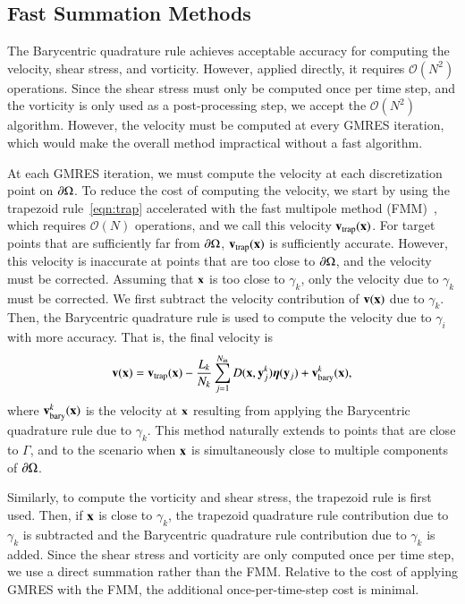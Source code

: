 \documentclass[preprint, 10pt]{elsarticle}
\begin{document}
\subsection{Fast Summation Methods}
\label{sec:fmm}
The Barycentric quadrature rule achieves acceptable accuracy for
computing the velocity, shear stress, and vorticity.  However, applied
directly, it requires $\mathcal{O}(N^2)$ operations.  Since the shear
stress must only be computed once per time step, and the vorticity is
only used as a post-processing step, we accept the $\mathcal{O}(N^2)$
algorithm.  However, the velocity must be computed at every GMRES
iteration, which would make the overall method impractical without a
fast algorithm.

At each GMRES iteration, we must compute the velocity at each
discretization point on ${\partial}\Omega$.  To reduce the cost of computing
the velocity, we start by using the trapezoid rule~\eqref{eqn:trap}
accelerated with the fast multipole method (FMM)~\cite{gre-rok1987},
which requires $\mathcal{O}(N)$ operations, and we call this velocity
${\mathbf{v}}_{\mathrm{trap}}({\mathbf{x}})$.  For target points that are sufficiently far from
${\partial}\Omega$, ${\mathbf{v}}_{\mathrm{trap}}({\mathbf{x}})$ is sufficiently accurate.  However, this
velocity is inaccurate at points that are too close to ${\partial}\Omega$, and
the velocity must be corrected.  Assuming that ${\mathbf{x}}$ is too close to
$\gamma_k$, only the velocity due to $\gamma_k$ must be corrected. We
first subtract the velocity contribution of ${\mathbf{v}}({\mathbf{x}})$ due to
$\gamma_k$.  Then, the Barycentric quadrature rule is used to compute
the velocity due to $\gamma_i$ with more accuracy.  That is, the final
velocity is
\begin{align}
  {\mathbf{v}}({\mathbf{x}}) = {\mathbf{v}}_{\mathrm{trap}}({\mathbf{x}}) - \frac{L_k}{N_k} \sum_{j=1}^{N_{\mathrm{in}}} 
    D({\mathbf{x}},{\mathbf{y}}^k_j) {\boldsymbol\eta}({\mathbf{y}}_j) + {\mathbf{v}}^k_{\mathrm{bary}}({\mathbf{x}}),
\end{align}
where ${\mathbf{v}}^k_{\mathrm{bary}}({\mathbf{x}})$ is the velocity at ${\mathbf{x}}$ resulting from
applying the Barycentric quadrature rule due to $\gamma_k$.  This method
naturally extends to points that are close to $\Gamma$, and to the
scenario when ${\mathbf{x}}$ is simultaneously close to multiple components of
${\partial}\Omega$.

Similarly, to compute the vorticity and shear stress, the trapezoid rule
is first used.  Then, if ${\mathbf{x}}$ is close to $\gamma_k$, the trapezoid
quadrature rule contribution due to $\gamma_k$ is subtracted and the
Barycentric quadrature rule contribution due to $\gamma_k$ is added.
Since the shear stress and vorticity are only computed once per time
step, we use a direct summation rather than the FMM.  Relative to the
cost of applying GMRES with the FMM, the additional once-per-time-step
cost is minimal.
\end{document}

